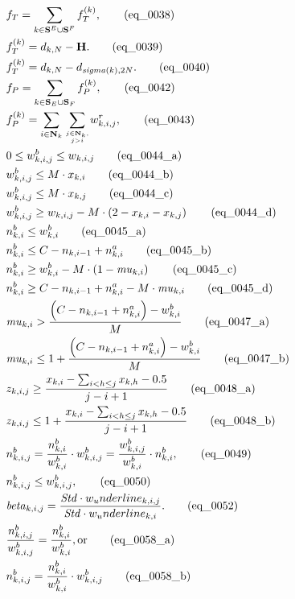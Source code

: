 \begin{align}
  & f_{T} = \sum_{k \in \mathbf{S}^{E} \cup \mathbf{S}^{F}} f_{T}^{\left(k\right)} , \tag{eq\_0038} \\
  & f_{T}^{\left(k\right)} = d_{k , N} - \mathbf{H} . \tag{eq\_0039} \\
  & f_{T}^{\left(k\right)} = d_{k , N} - d_{\mathit{sigma} \left(k\right) , 2 N} . \tag{eq\_0040} \\
  & f_{P} = \sum_{k \in \mathbf{S}_{E} \cup \mathbf{S}_{F}} f_{P}^{\left(k\right)} , \tag{eq\_0042} \\
  & f_{P}^{\left(k\right)} = \sum_{i \in \mathbf{N}_{k}} \underset{\genfrac{}{}{0pt}{}{j \in \mathbf{N}_{k} ,}{j > i}}{\sum} w_{k , i , j}^{r} , \tag{eq\_0043} \\
  & 0 \leq w_{k , i , j}^{b} \leq w_{k , i , j} \tag{eq\_0044\_a} \\
  & w_{k , i , j}^{b} \leq M \cdot x_{k , i} \tag{eq\_0044\_b} \\
  & w_{k , i , j}^{b} \leq M \cdot x_{k , j} \tag{eq\_0044\_c} \\
  & w_{k , i , j}^{b} \geq w_{k , i , j} - M \cdot \left(2 - x_{k , i} - x_{k , j}\right) \tag{eq\_0044\_d} \\
  & n_{k , i}^{b} \leq w_{k , i}^{b} \tag{eq\_0045\_a} \\
  & n_{k , i}^{b} \leq C - n_{k , i - 1} + n_{k , i}^{a} \tag{eq\_0045\_b} \\
  & n_{k , i}^{b} \geq w_{k , i}^{b} - M \cdot \left(1 - \mathit{mu}_{k , i}\right) \tag{eq\_0045\_c} \\
  & n_{k , i}^{b} \geq C - n_{k , i - 1} + n_{k , i}^{a} - M \cdot \mathit{mu}_{k , i} \tag{eq\_0045\_d} \\
  & \mathit{mu}_{k , i} > \frac{\left(C - n_{k , i - 1} + n_{k , i}^{a}\right) - w_{k , i}^{b}}{M} \tag{eq\_0047\_a} \\
  & \mathit{mu}_{k , i} \leq 1 + \frac{\left(C - n_{k , i - 1} + n_{k , i}^{a}\right) - w_{k , i}^{b}}{M} \tag{eq\_0047\_b} \\
  & z_{k , i , j} \geq \frac{x_{k , i} - \sum_{i < h \leq j} x_{k , h} - 0.5}{j - i + 1} \tag{eq\_0048\_a} \\
  & z_{k , i , j} \leq 1 + \frac{x_{k , i} - \sum_{i < h \leq j} x_{k , h} - 0.5}{j - i + 1} \tag{eq\_0048\_b} \\
  & n_{k , i , j}^{b} = \frac{n_{k , i}^{b}}{w_{k , i}^{b}} \cdot w_{k , i , j}^{b} = \frac{w_{k , i , j}^{b}}{w_{k , i}^{b}} \cdot n_{k , i}^{b} , \tag{eq\_0049} \\
  &  n_{k , i , j}^{b} \leq w_{k , i , j}^{b} ,  \tag{eq\_0050} \\
  & \mathit{beta}_{k , i , j} = \frac{\mathit{Std} \cdot w_underline_{k , i , j}}{\mathit{Std} \cdot w_underline_{k , i}} . \tag{eq\_0052} \\
  & \frac{n_{k , i , j}^{b}}{w_{k , i , j}^{b}} = \frac{n_{k , i}^{b}}{w_{k , i}^{b}} , \text{or} \tag{eq\_0058\_a} \\
  & n_{k , i , j}^{b} = \frac{n_{k , i}^{b}}{w_{k , i}^{b}} \cdot w_{k , i , j}^{b} \tag{eq\_0058\_b} \\
\end{align}

